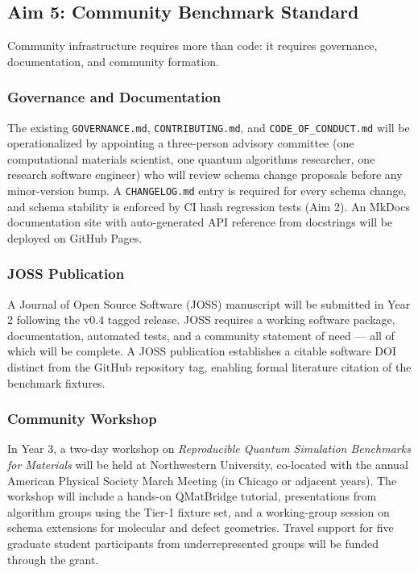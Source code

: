 \documentclass[11pt]{article}
\begin{document}
\subsection{Aim 5: Community Benchmark Standard}

Community infrastructure requires more than code: it requires governance,
documentation, and community formation.

\subsubsection{Governance and Documentation}

The existing \texttt{GOVERNANCE.md}, \texttt{CONTRIBUTING.md}, and
\texttt{CODE\_OF\_CONDUCT.md} will be operationalized by appointing
a three-person advisory committee (one computational materials scientist,
one quantum algorithms researcher, one research software engineer) who
will review schema change proposals before any minor-version bump.
A \texttt{CHANGELOG.md} entry is required for every schema change,
and schema stability is enforced by CI hash regression tests (Aim 2).
An MkDocs documentation site with auto-generated API reference from
docstrings will be deployed on GitHub Pages.

\subsubsection{JOSS Publication}

A Journal of Open Source Software (JOSS) manuscript will be submitted
in Year 2 following the v0.4 tagged release.
JOSS requires a working software package, documentation, automated tests,
and a community statement of need --- all of which will be complete.
A JOSS publication establishes a citable software DOI distinct from the
GitHub repository tag, enabling formal literature citation of the
benchmark fixtures.

\subsubsection{Community Workshop}

In Year 3, a two-day workshop on \emph{Reproducible Quantum Simulation
Benchmarks for Materials} will be held at Northwestern University,
co-located with the annual American Physical Society March Meeting
(in Chicago or adjacent years).
The workshop will include a hands-on QMatBridge tutorial, presentations
from algorithm groups using the Tier-1 fixture set, and a working-group
session on schema extensions for molecular and defect geometries.
Travel support for five graduate student participants from
underrepresented groups will be funded through the grant.
\end{document}
